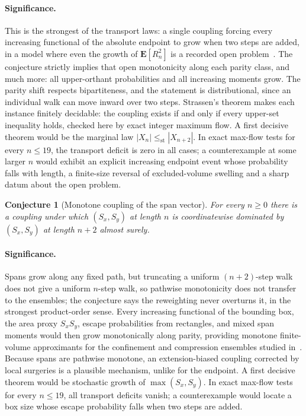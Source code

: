 \documentclass[11pt]{article}
\newtheorem{conjecture}{Conjecture}
\theoremstyle{definition}
\begin{document}
\paragraph{Significance.}
This is the strongest of the transport laws: a single coupling forcing every increasing functional of the absolute endpoint to grow when two steps are added, in a model where even the growth of $\mathbf E[R_n^2]$ is a recorded open problem~\cite{MS93,BDGS12}.  The conjecture strictly implies that open monotonicity along each parity class, and much more: all upper-orthant probabilities and all increasing moments grow.  The parity shift respects bipartiteness, and the statement is distributional, since an individual walk can move inward over two steps.  Strassen's theorem makes each instance finitely decidable: the coupling exists if and only if every upper-set inequality holds, checked here by exact integer maximum flow.  A first decisive theorem would be the marginal law $|X_n|\le_{\mathrm{st}}|X_{n+2}|$.  In exact max-flow tests for every $n\le19$, the transport deficit is zero in all cases; a counterexample at some larger $n$ would exhibit an explicit increasing endpoint event whose probability falls with length, a finite-size reversal of excluded-volume swelling and a sharp datum about the open problem.

\begin{conjecture}[Monotone coupling of the span vector]\label{af6}
For every $n\ge0$ there is a coupling under which $(S_x,S_y)$ at length $n$ is coordinatewise dominated by $(S_x,S_y)$ at length $n+2$ almost surely.
\end{conjecture}

\paragraph{Significance.}
Spans grow along any fixed path, but truncating a uniform $(n+2)$-step walk does not give a uniform $n$-step walk, so pathwise monotonicity does not transfer to the ensembles; the conjecture says the reweighting never overturns it, in the strongest product-order sense.  Every increasing functional of the bounding box, the area proxy $S_xS_y$, escape probabilities from rectangles, and mixed span moments would then grow monotonically along parity, providing monotone finite-volume approximants for the confinement and compression ensembles studied in~\cite{BBO25}.  Because spans are pathwise monotone, an extension-biased coupling corrected by local surgeries is a plausible mechanism, unlike for the endpoint.  A first decisive theorem would be stochastic growth of $\max(S_x,S_y)$.  In exact max-flow tests for every $n\le19$, all transport deficits vanish; a counterexample would locate a box size whose escape probability falls when two steps are added.
\end{document}
